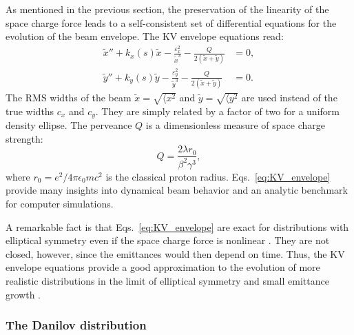 As mentioned in the previous section, the preservation of the linearity of the space charge force leads to a self-consistent set of differential equations for the evolution of the beam envelope. The KV envelope equations read:
%
\begin{align} \label{eq:KV_envelope}
    \tilde{x}'' + k_{x}(s)\tilde{x} - \frac{\varepsilon_x^2}{\tilde{x}^3} - \frac{Q}{2\left(\tilde{x} + \tilde{y}\right)} &= 0, \\
    \tilde{y}'' + k_{y}(s)\tilde{y} - \frac{\varepsilon_y^2}{\tilde{y}^3} - \frac{Q}{2\left(\tilde{x} + \tilde{y}\right)} &= 0. \nonumber
\end{align}
%
The RMS widths of the beam $\tilde{x} = \sqrt{\langle{{x^2}}}$ and $\tilde{y} = \sqrt{\langle{{y^2}}}$ are used instead of the true widths $c_x$ and $c_y$. They are simply related by a factor of two for a uniform density ellipse. The perveance $Q$ is a dimensionless measure of space charge strength:
%
\begin{equation}\label{eq:perveance}
    Q = \frac{2\lambda r_0}{\beta^2\gamma^3},
\end{equation}
%
where $r_0 = e^2 / 4\pi\epsilon_0mc^2$ is the classical proton radius. Eqs.~\eqref{eq:KV_envelope} provide many insights into dynamical beam behavior and an analytic benchmark for computer simulations.  

A remarkable fact is that Eqs.~\eqref{eq:KV_envelope} are exact for distributions with elliptical symmetry even if the space charge force is nonlinear \cite{Sacherer1968}. They are not closed, however, since the emittances would then depend on time. Thus, the KV envelope equations provide a good approximation to the evolution of more realistic distributions in the limit of elliptical symmetry and small emittance growth \cite{Lund2004}.


\subsubsection{The Danilov distribution}

